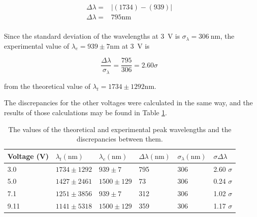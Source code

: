 \documentclass[a4paper]{article}
\begin{document}
\begin{align*}
  \Delta \lambda =& \left| (1734) - (939) \right| \\
  \Delta \lambda =& 795 \si{\nano\meter} \\
\end{align*}

Since the standard deviation of the wavelengths at \SI{3}{\volt} is \(
\sigma_{\lambda} = \SI{306}{\nano\meter} \), the experimental value of \(
\lambda_e = 939 \pm 7 \si{\nano\meter} \) at \SI{3}{\volt} is

\begin{equation*}
  \frac{\Delta \lambda}{\sigma_{\lambda}} = \frac{795}{306} = 2.60 \sigma
\end{equation*}

from the theoretical value of \( \lambda_t = 1734 \pm 1292 \si{\nano\meter} \).

\qq The discrepancies for the other voltages were calculated in the same way,
and the results of those calculations may be found in Table
\ref{tab:peakWavelengths}.

\begin{table}[H]
  \caption{The values of the theoretical and experimental peak wavelengths and
    the discrepancies between them.}
  \label{tab:peakWavelengths}
  \begin{center}
    \begin{tabular}{|l|l|l|l|l|l|}
      \hline
      Voltage (\si{\volt}) & \( \lambda_t (\si{\nano\meter}) \) & 
      \( \lambda_e (\si{\nano\meter}) \) & 
      \( \Delta \lambda (\si{\nano\meter}) \) & 
      \( \sigma_{\lambda} (\si{\nano\meter}) \) &
      \( \sigma \Delta \lambda \) \\
      \hline
      3.0 & \( 1734 \pm 1292 \) & \( 939 \pm 7 \) & 795 & 306 & 2.60 \( \sigma
                                                                \) \\
      5.0 & \( 1427 \pm 2461 \) & \( 1500 \pm 129 \) & 73 & 306 & 0.24 \( \sigma
                                                                  \) \\
      7.1 & \( 1251 \pm 3856 \) & \( 939 \pm 7 \) & 312 & 306 & 1.02 \( \sigma
                                                                \) \\
      9.11 & \( 1141 \pm 5318 \) & \( 1500 \pm 129 \) & 359 & 306 & 1.17 \(
                                                                    \sigma \) \\
      \hline
    \end{tabular}
  \end{center}
\end{table}
\end{document}
